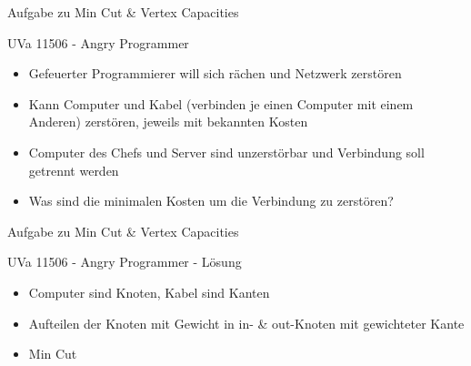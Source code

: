 \begin{frame}{Aufgabe zu Min Cut \& Vertex Capacities}
    \begin{block}{UVa 11506 - Angry Programmer}
        \begin{itemize}
            \item Gefeuerter Programmierer will sich rächen und Netzwerk zerstören
            \pause\item Kann Computer und Kabel (verbinden je einen Computer mit einem
            Anderen) zerstören, jeweils mit bekannten Kosten
            \pause\item Computer des Chefs und Server sind unzerstörbar und Verbindung
soll getrennt werden
            \pause\item Was sind die minimalen Kosten um die Verbindung zu zerstören?
        \end{itemize}
    \end{block}
\end{frame}

\begin{frame}{Aufgabe zu Min Cut \& Vertex Capacities}
    \begin{block}{UVa 11506 - Angry Programmer - Lösung}
        \begin{itemize}
            \pause\item Computer sind Knoten, Kabel sind Kanten
            \pause\item Aufteilen der Knoten mit Gewicht in in- \& out-Knoten mit
            gewichteter Kante
            \pause\item Min Cut
        \end{itemize}
    \end{block}
\end{frame}

